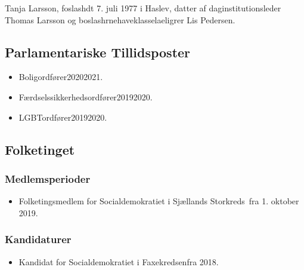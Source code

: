 \documentclass[11pt, a4paper]{awesome-cv}
\begin{document}
\makecvheader[R]
\makelettertitle
\begin{cvletter}
Tanja Larsson, foslashdt 7. juli 1977 i Haslev, datter af daginstitutionsleder Thomas Larsson og boslashrnehaveklasselaeligrer Lis Pedersen.

\subsection*{Parlamentariske Tillidsposter}
\begin{itemize}
\item Boligordfører20202021.
\item Færdselssikkerhedsordfører20192020.
\item LGBTordfører20192020.
\end{itemize}
\subsection*{Folketinget}
\subsubsection*{Medlemsperioder}
\begin{itemize}
\item Folketingsmedlem for Socialdemokratiet i Sjællands Storkreds fra 1. oktober 2019.
\end{itemize}
\subsubsection*{Kandidaturer}
\begin{itemize}
\item Kandidat for Socialdemokratiet i Faxekredsenfra 2018.
\end{itemize}
\end{cvletter}
\end{document}
